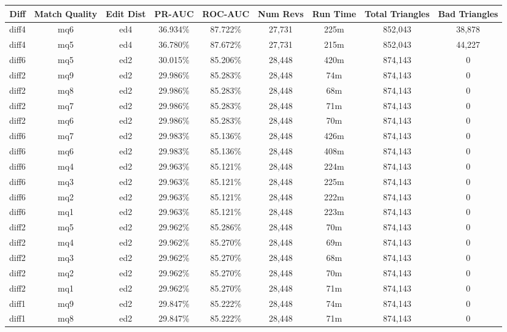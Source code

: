 \begin{sidewaystable}[!ph]
  \begin{center}
    \begin{tabular}{|c|c|c||c|c||c|c|c|c|}
\hline
Diff & Match Quality & Edit Dist
        & PR-AUC & ROC-AUC
        & Num Revs & Run Time
        & Total Triangles & Bad Triangles \\
\hline
\hline
diff4 & mq6 & ed4 & 36.934\% & 87.722\% & 27,731 & 225m & 852,043 & 38,878 \\
diff4 & mq5 & ed4 & 36.780\% & 87.672\% & 27,731 & 215m & 852,043 & 44,227 \\
diff6 & mq5 & ed2 & 30.015\% & 85.206\% & 28,448 & 420m & 874,143 & 0 \\
diff2 & mq9 & ed2 & 29.986\% & 85.283\% & 28,448 & 74m & 874,143 & 0 \\
diff2 & mq8 & ed2 & 29.986\% & 85.283\% & 28,448 & 68m & 874,143 & 0 \\
diff2 & mq7 & ed2 & 29.986\% & 85.283\% & 28,448 & 71m & 874,143 & 0 \\
diff2 & mq6 & ed2 & 29.986\% & 85.283\% & 28,448 & 70m & 874,143 & 0 \\
diff6 & mq7 & ed2 & 29.983\% & 85.136\% & 28,448 & 426m & 874,143 & 0 \\
diff6 & mq6 & ed2 & 29.983\% & 85.136\% & 28,448 & 408m & 874,143 & 0 \\
diff6 & mq4 & ed2 & 29.963\% & 85.121\% & 28,448 & 224m & 874,143 & 0 \\
diff6 & mq3 & ed2 & 29.963\% & 85.121\% & 28,448 & 225m & 874,143 & 0 \\
diff6 & mq2 & ed2 & 29.963\% & 85.121\% & 28,448 & 222m & 874,143 & 0 \\
diff6 & mq1 & ed2 & 29.963\% & 85.121\% & 28,448 & 223m & 874,143 & 0 \\
diff2 & mq5 & ed2 & 29.962\% & 85.286\% & 28,448 & 70m & 874,143 & 0 \\
diff2 & mq4 & ed2 & 29.962\% & 85.270\% & 28,448 & 69m & 874,143 & 0 \\
diff2 & mq3 & ed2 & 29.962\% & 85.270\% & 28,448 & 68m & 874,143 & 0 \\
diff2 & mq2 & ed2 & 29.962\% & 85.270\% & 28,448 & 70m & 874,143 & 0 \\
diff2 & mq1 & ed2 & 29.962\% & 85.270\% & 28,448 & 71m & 874,143 & 0 \\
diff1 & mq9 & ed2 & 29.847\% & 85.222\% & 28,448 & 74m & 874,143 & 0 \\
diff1 & mq8 & ed2 & 29.847\% & 85.222\% & 28,448 & 71m & 874,143 & 0 \\

\end{tabular}
\end{center}
\end{sidewaystable}
